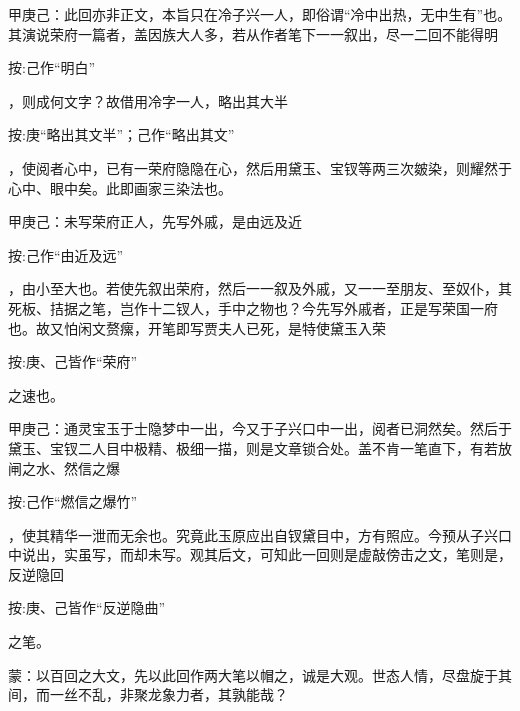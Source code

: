
\begin{parag}
    \begin{note}甲庚己：此回亦非正文，本旨只在冷子兴一人，即俗谓“冷中出热，无中生有”也。其演说荣府一篇者，盖因族大人多，若从作者笔下一一叙出，尽一二回不能得明\begin{subnote}按:己作“明白”\end{subnote}，则成何文字？故借用冷字一人，略出其大半\begin{subnote}按:庚“略出其文半”；己作“略出其文”\end{subnote}，使阅者心中，已有一荣府隐隐在心，然后用黛玉、宝钗等两三次皴染，则耀然于心中、眼中矣。此即画家三染法也。\end{note}
\end{parag}


\begin{parag}
    \begin{note}甲庚己：未写荣府正人，先写外戚，是由远及近\begin{subnote}按:己作“由近及远”\end{subnote}，由小至大也。若使先叙出荣府，然后一一叙及外戚，又一一至朋友、至奴仆，其死板、拮据之笔，岂作十二钗人，手中之物也？今先写外戚者，正是写荣国一府也。故又怕闲文赘瘰，开笔即写贾夫人已死，是特使黛玉入荣\begin{subnote}按:庚、己皆作“荣府”\end{subnote}之速也。\end{note}
\end{parag}


\begin{parag}
    \begin{note}甲庚己：通灵宝玉于士隐梦中一出，今又于子兴口中一出，阅者已洞然矣。然后于黛玉、宝钗二人目中极精、极细一描，则是文章锁合处。盖不肯一笔直下，有若放闸之水、然信之爆\begin{subnote}按:己作“燃信之爆竹”\end{subnote}，使其精华一泄而无余也。究竟此玉原应出自钗黛目中，方有照应。今预从子兴口中说出，实虽写，而却未写。观其后文，可知此一回则是虚敲傍击之文，笔则是，反逆隐回\begin{subnote}按:庚、己皆作“反逆隐曲”\end{subnote}之笔。\end{note}
\end{parag}


\begin{parag}
    \begin{note}蒙：以百回之大文，先以此回作两大笔以帽之，诚是大观。世态人情，尽盘旋于其间，而一丝不乱，非聚龙象力者，其孰能哉？\end{note}
\end{parag}


